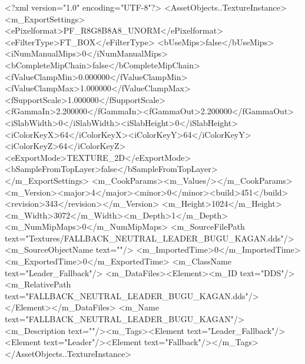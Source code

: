 <?xml version="1.0" encoding="UTF-8"?>
<AssetObjects..TextureInstance>
  <m_ExportSettings>
    <ePixelformat>PF_R8G8B8A8_UNORM</ePixelformat><eFilterType>FT_BOX</eFilterType>
    <bUseMips>false</bUseMips><iNumManualMips>0</iNumManualMips><bCompleteMipChain>false</bCompleteMipChain>
    <fValueClampMin>0.000000</fValueClampMin><fValueClampMax>1.000000</fValueClampMax><fSupportScale>1.000000</fSupportScale>
    <fGammaIn>2.200000</fGammaIn><fGammaOut>2.200000</fGammaOut><iSlabWidth>0</iSlabWidth><iSlabHeight>0</iSlabHeight>
    <iColorKeyX>64</iColorKeyX><iColorKeyY>64</iColorKeyY><iColorKeyZ>64</iColorKeyZ>
    <eExportMode>TEXTURE_2D</eExportMode><bSampleFromTopLayer>false</bSampleFromTopLayer>
  </m_ExportSettings>
  <m_CookParams><m_Values/></m_CookParams>
  <m_Version><major>4</major><minor>0</minor><build>451</build><revision>343</revision></m_Version>
  <m_Height>1024</m_Height><m_Width>3072</m_Width><m_Depth>1</m_Depth><m_NumMipMaps>0</m_NumMipMaps>
  <m_SourceFilePath text="Textures/FALLBACK_NEUTRAL_LEADER_BUGU_KAGAN.dds"/><m_SourceObjectName text=""/>
  <m_ImportedTime>0</m_ImportedTime><m_ExportedTime>0</m_ExportedTime>
  <m_ClassName text="Leader_Fallback"/>
  <m_DataFiles><Element><m_ID text="DDS"/><m_RelativePath text="FALLBACK_NEUTRAL_LEADER_BUGU_KAGAN.dds"/></Element></m_DataFiles>
  <m_Name text="FALLBACK_NEUTRAL_LEADER_BUGU_KAGAN"/><m_Description text=""/><m_Tags><Element text="Leader_Fallback"/><Element text="Leader"/><Element text="Fallback"/></m_Tags>
</AssetObjects..TextureInstance>
